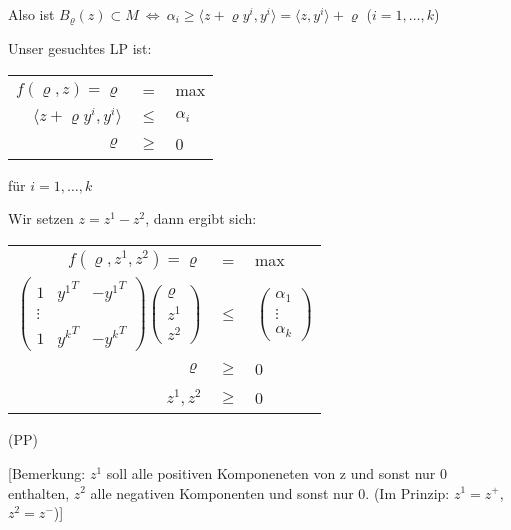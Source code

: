 \documentclass[a4paper,11pt,twoside,titlepage]{article}
\begin{document}
Also ist $B_\varrho(z)\subset M\ \Leftrightarrow\ \alpha_i\geq\langle z+\varrho y^i,y^i\rangle=\langle z,y^i\rangle+\varrho$ ($i=1,\ldots,k$)\newline
[Beachte: $\langle z+\varrho y^i,y^i\rangle=f_i(z+\varrho y^i)$; $\|y^i\|=1$]

Unser gesuchtes LP ist:
\begin{center}
\begin{tabular}{|rcl|}\hline
$f(\varrho,z)=\varrho$&=&max\\
$\langle z+\varrho y^i,y^i\rangle$&$\leq$&$\alpha_i$\\
$\varrho$&$\geq$&0\\\hline
\end{tabular} für $i=1,\ldots,k$
\end{center}
Wir setzen $z=z^1-z^2$, dann ergibt sich:
\begin{center}
\begin{tabular}{|rcl|}\hline
$f(\varrho,z^1,z^2)=\varrho$&=&max\\
$\begin{pmatrix}1&{y^1}^T&-{y^1}^T\\\vdots&&\\1&{y^k}^T&-{y^k}^T\end{pmatrix}
\begin{pmatrix}\varrho\\z^1\\z^2\end{pmatrix}$&$\leq$&$\begin{pmatrix}\alpha_1\\\vdots\\\alpha_k\end{pmatrix}$\\
$\varrho$&$\geq$&0\\
$z^1,z^2$&$\geq$&0\\\hline
\end{tabular} (PP)
\end{center}
[Bemerkung: $z^1$ soll alle positiven Komponeneten von z und sonst nur 0 enthalten, $z^2$ alle negativen Komponenten und sonst nur 0. (Im Prinzip: $z^1=z^+$, $z^2=z^-$)]
\end{document}
